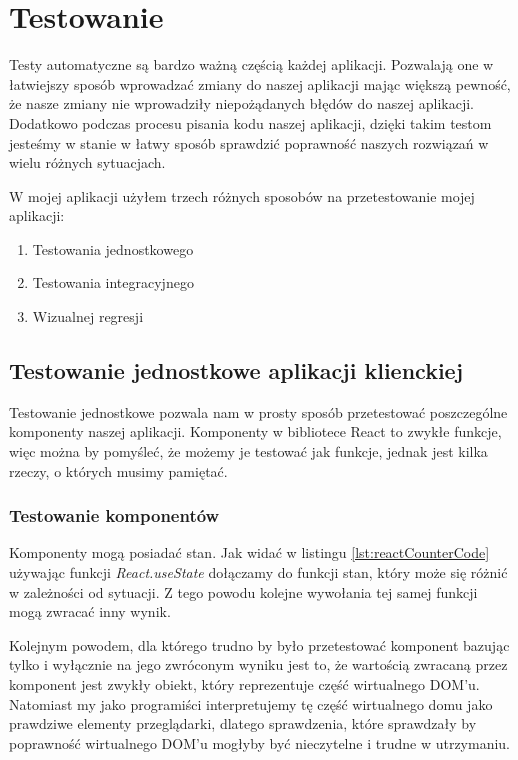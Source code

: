 \newpage
\section{Testowanie}
Testy automatyczne są bardzo ważną częścią każdej aplikacji. Pozwalają one w łatwiejszy sposób wprowadzać zmiany do naszej aplikacji mając większą pewność, że nasze zmiany nie wprowadziły niepożądanych błędów do naszej aplikacji. Dodatkowo podczas procesu pisania kodu naszej aplikacji, dzięki takim testom jesteśmy w stanie w łatwy sposób sprawdzić poprawność naszych rozwiązań w wielu różnych sytuacjach. 

W mojej aplikacji użyłem trzech różnych sposobów na przetestowanie mojej aplikacji:
\begin{enumerate}
  \item Testowania jednostkowego
  \item Testowania integracyjnego
  \item Wizualnej regresji
\end{enumerate}

\subsection{Testowanie jednostkowe aplikacji klienckiej}
Testowanie jednostkowe pozwala nam w prosty sposób przetestować poszczególne komponenty naszej aplikacji. Komponenty w bibliotece React to zwykłe funkcje, więc można by pomyśleć, że możemy je testować jak funkcje, jednak jest kilka rzeczy, o których musimy pamiętać. 

\subsubsection{Testowanie komponentów}
Komponenty mogą posiadać stan. Jak widać w listingu \ref{lst:reactCounterCode} używając funkcji \emph{React.useState} dołączamy do funkcji stan, który może się różnić w zależności od sytuacji. Z tego powodu kolejne wywołania tej samej funkcji mogą zwracać inny wynik. 

Kolejnym powodem, dla którego trudno by było przetestować komponent bazując tylko i wyłącznie na jego zwróconym wyniku jest to, że wartością zwracaną przez komponent jest zwykły obiekt, który reprezentuje część wirtualnego DOM'u. Natomiast my jako programiści interpretujemy tę część wirtualnego domu jako prawdziwe elementy przeglądarki, dlatego sprawdzenia, które sprawdzały by poprawność wirtualnego DOM'u mogłyby być nieczytelne i trudne w utrzymaniu.

